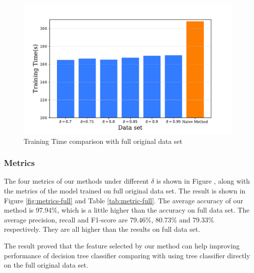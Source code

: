 \documentclass{ieeeaccess}
\theoremstyle{definition}
\begin{document}
\begin{figure}[!htpb]
    \centering
    \includegraphics[scale=0.4]{fig/training-time-all.pdf}
    \caption{Training Time comparison with full original data set}
    \label{fig:training-time-with-full}
\end{figure}

\subsubsection{Metrics}

The four metrics of our methods under different $\delta$ is shown in Figure , along with the metrics of the model trained on full original data set. The result is shown in Figure \ref{fig:metrics-full} and Table \ref{tab:metric-full}. The average accuracy of our method is 97.94\%, which is a little higher than the accuracy on full data set. The average precision, recall and F1-score are 79.46\%, 80.73\% and 79.33\% respectively. They are all higher than the results on full data set.

The result proved that the feature selected by our method can help improving performance of decision tree classifier comparing with using tree classifier directly on the full original data set.
\end{document}
